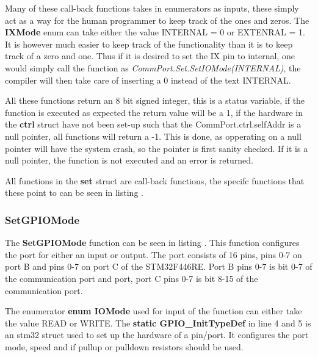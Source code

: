 Many of these call-back functions takes in enumerators as inputs, these simply act as a way for the human programmer to keep track of the ones and zeros. The \textbf{IXMode} enum can take either the value INTERNAL = 0 or EXTENRAL = 1. It is however much easier to keep track of the functionality than it is to keep track of a zero and one. Thus if it is desired to set the IX pin to internal, one would simply call the function as \textit{CommPort.Set.SetIOMode(INTERNAL)}, the compiler will then take care of inserting a 0 instead of the text INTERNAL. 

All these functions return an 8 bit signed integer, this is a status variable, if the function is executed as expected the return value will be a 1, if the hardware in the \textbf{ctrl} struct have not been set-up such that the CommPort.ctrl.selfAddr is a null pointer, all functions will return a -1. This is done, as opperating on a null pointer will have the system crash, so the pointer is first sanity checked. If it is a null pointer, the function is not executed and an error is returned.

All functions in the \textbf{set} struct are call-back functions, the specifc functions that these point to can be seen in listing .


\subsubsection*{SetGPIOMode}
The \textbf{SetGPIOMode} function can be seen in listing . This function configures the port for either an input or output. The port consists of 16 pins, pins 0-7 on port B and pins 0-7 on port C of the STM32F446RE. Port B pins 0-7 is bit 0-7 of the communication port and port, port C pins 0-7 is bit 8-15 of the communication port.


The enumerator \textbf{enum IOMode} used for input of the function can either take the value READ or WRITE. The \textbf{static GPIO\_InitTypeDef} in line 4 and 5 is an stm32 struct used to set up the hardware of a pin/port. It configures the port mode, speed and if pullup or pulldown resistors should be used.

